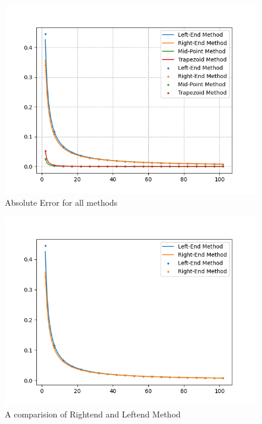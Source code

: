 \documentclass[12pt]{article}
\begin{document}
\begin{figure}[H]
    \centering
    \includegraphics[width=13cm]{error4.png}
    \caption{Absolute Error for all methods}
\end{figure}

\begin{figure}[H]
    \centering
    \includegraphics[width=13cm]{error_rl.png}
    \caption{A comparision of Rightend and Leftend Method}
\end{figure}
\end{document}
